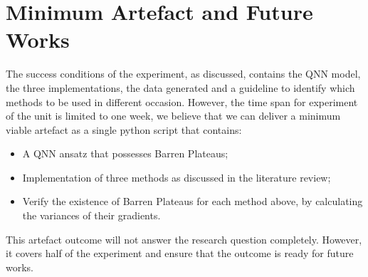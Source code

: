 \section{Minimum Artefact and Future Works}

The success conditions of the experiment, as discussed, contains the QNN model, the three implementations, the data generated and a guideline to identify which methods to be used in different occasion.
However, the time span for experiment of the unit is limited to one week, we believe that we can deliver a minimum viable artefact as a single python script that contains:
\begin{itemize}
    \item A QNN ansatz that possesses Barren Plateaus;
    \item Implementation of three methods as discussed in the literature review;
    \item Verify the existence of Barren Plateaus for each method above, by calculating the variances of their gradients.
\end{itemize}

This artefact outcome will not answer the research question completely. 
However, it covers half of the experiment and ensure that the outcome is ready for future works.
